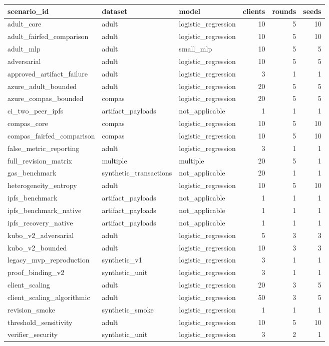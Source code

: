 \begin{tabular}{lllrrr}
\toprule
scenario\_id & dataset & model & clients & rounds & seeds \\
\midrule
adult\_core & adult & logistic\_regression & 10 & 5 & 10 \\
adult\_fairfed\_comparison & adult & logistic\_regression & 10 & 5 & 10 \\
adult\_mlp & adult & small\_mlp & 10 & 5 & 5 \\
adversarial & adult & logistic\_regression & 10 & 5 & 5 \\
approved\_artifact\_failure & adult & logistic\_regression & 3 & 1 & 1 \\
azure\_adult\_bounded & adult & logistic\_regression & 20 & 5 & 5 \\
azure\_compas\_bounded & compas & logistic\_regression & 20 & 5 & 5 \\
ci\_two\_peer\_ipfs & artifact\_payloads & not\_applicable & 1 & 1 & 1 \\
compas\_core & compas & logistic\_regression & 10 & 5 & 10 \\
compas\_fairfed\_comparison & compas & logistic\_regression & 10 & 5 & 10 \\
false\_metric\_reporting & adult & logistic\_regression & 3 & 1 & 1 \\
full\_revision\_matrix & multiple & multiple & 20 & 5 & 1 \\
gas\_benchmark & synthetic\_transactions & not\_applicable & 20 & 1 & 1 \\
heterogeneity\_entropy & adult & logistic\_regression & 10 & 5 & 10 \\
ipfs\_benchmark & artifact\_payloads & not\_applicable & 1 & 1 & 1 \\
ipfs\_benchmark\_native & artifact\_payloads & not\_applicable & 1 & 1 & 1 \\
ipfs\_recovery\_native & artifact\_payloads & not\_applicable & 1 & 1 & 1 \\
kubo\_v2\_adversarial & adult & logistic\_regression & 5 & 3 & 3 \\
kubo\_v2\_bounded & adult & logistic\_regression & 10 & 3 & 3 \\
legacy\_mvp\_reproduction & synthetic\_v1 & logistic\_regression & 3 & 1 & 1 \\
proof\_binding\_v2 & synthetic\_unit & logistic\_regression & 3 & 1 & 1 \\
client\_scaling & adult & logistic\_regression & 20 & 3 & 5 \\
client\_scaling\_algorithmic & adult & logistic\_regression & 50 & 3 & 5 \\
revision\_smoke & synthetic\_smoke & logistic\_regression & 1 & 1 & 1 \\
threshold\_sensitivity & adult & logistic\_regression & 10 & 5 & 10 \\
verifier\_security & synthetic\_unit & logistic\_regression & 3 & 2 & 1 \\
\bottomrule
\end{tabular}
